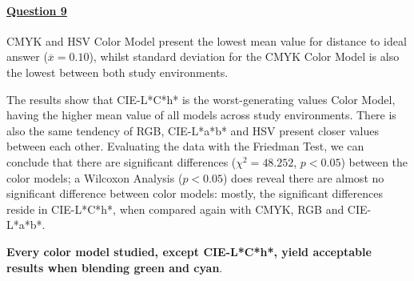 \paragraph{\ul{Question 9}}
%
CMYK and HSV Color Model present the lowest mean value for distance to ideal answer ($\overline{x} = 0.10$), whilst standard deviation for the CMYK Color Model is also the lowest between both study environments. \par
The results show that CIE-L*C*h* is the worst-generating values Color Model, having the higher mean value of all models across study environments. There is also the same tendency of RGB,
CIE-L*a*b* and HSV present closer values between each other. Evaluating the data with the Friedman Test, we can conclude that there are significant differences ($\chi^2 = 48.252$, $p < 0.05$)
between the color models; a Wilcoxon Analysis ($p < 0.05$) does reveal there are almost no significant difference between color models: mostly, the significant differences reside in CIE-L*C*h*, when
compared again with CMYK, RGB and CIE-L*a*b*. \par
%
\textbf{Every color model studied, except CIE-L*C*h*, yield acceptable results when blending green and cyan}.
%

